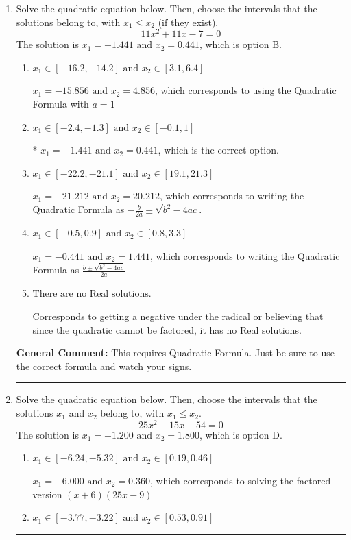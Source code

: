 \documentclass{extbook}[14pt]
\newcommand{\litem}[1]{\item #1

\rule{\textwidth}{0.4pt}}
\begin{document}
\begin{enumerate}\litem{
Solve the quadratic equation below. Then, choose the intervals that the solutions belong to, with $x_1 \leq x_2$ (if they exist).
\[ 11x^{2} +11 x -7 = 0 \]The solution is \( x_1 = -1.441 \text{ and } x_2 = 0.441 \), which is option B.\begin{enumerate}[label=\Alph*.]
\item \( x_1 \in [-16.2, -14.2] \text{ and } x_2 \in [3.1, 6.4] \)

 $x_1 = -15.856 \text{ and } x_2 = 4.856$, which corresponds to using the Quadratic Formula with $a=1$
\item \( x_1 \in [-2.4, -1.3] \text{ and } x_2 \in [-0.1, 1] \)

* $x_1 = -1.441 \text{ and } x_2 = 0.441$, which is the correct option.
\item \( x_1 \in [-22.2, -21.1] \text{ and } x_2 \in [19.1, 21.3] \)

 $x_1 = -21.212 \text{ and } x_2 = 20.212$, which corresponds to writing the Quadratic Formula as $-\frac{b}{2a} \pm \sqrt{b^2 - 4ac}$.
\item \( x_1 \in [-0.5, 0.9] \text{ and } x_2 \in [0.8, 3.3] \)

 $x_1 = -0.441 \text{ and } x_2 = 1.441$, which corresponds to writing the Quadratic Formula as $\frac{b \pm \sqrt{b^2 - 4ac}}{2a}$
\item \( \text{There are no Real solutions.} \)

Corresponds to getting a negative under the radical or believing that since the quadratic cannot be factored, it has no Real solutions.
\end{enumerate}

\textbf{General Comment:} This requires Quadratic Formula. Just be sure to use the correct formula and watch your signs.
}
\litem{
Solve the quadratic equation below. Then, choose the intervals that the solutions $x_1$ and $x_2$ belong to, with $x_1 \leq x_2$.
\[ 25x^{2} -15 x -54 = 0 \]The solution is \( x_1 = -1.200 \text{ and } x_2 = 1.800 \), which is option D.\begin{enumerate}[label=\Alph*.]
\item \( x_1 \in [-6.24, -5.32] \text{ and } x_2 \in [0.19, 0.46] \)

$x_1 = -6.000 \text{ and } x_2 = 0.360$, which corresponds to solving the factored version $(x + 6)(25x -9)$
\item \( x_1 \in [-3.77, -3.22] \text{ and } x_2 \in [0.53, 0.91] \)


\end{enumerate}}
\end{enumerate}
\end{document}
